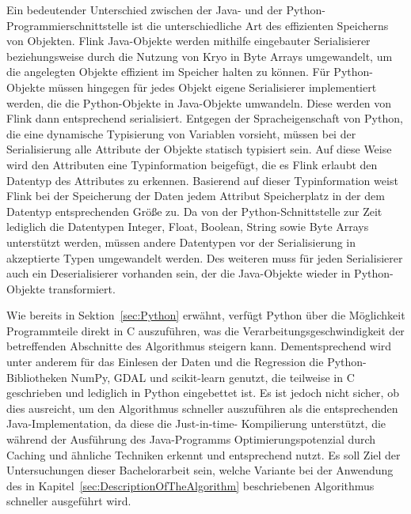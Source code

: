 Ein bedeutender Unterschied zwischen der Java- und der Python-Programmierschnittstelle ist die unterschiedliche Art des effizienten Speicherns von Objekten. Flink Java-Objekte werden mithilfe eingebauter Serialisierer beziehungsweise durch die Nutzung von Kryo in Byte Arrays umgewandelt, um die angelegten Objekte effizient im Speicher halten zu können. Für Python-Objekte müssen hingegen für jedes Objekt eigene Serialisierer implementiert werden, die die Python-Objekte in Java-Objekte umwandeln. Diese werden von Flink dann entsprechend serialisiert. Entgegen der Spracheigenschaft von Python, die eine dynamische Typisierung von Variablen vorsieht, müssen bei der Serialisierung alle Attribute der Objekte statisch typisiert sein. Auf diese Weise wird den Attributen eine Typinformation beigefügt, die es Flink erlaubt den Datentyp des Attributes zu erkennen. Basierend auf dieser Typinformation weist Flink bei der Speicherung der Daten jedem Attribut Speicherplatz in der dem Datentyp entsprechenden Größe zu. Da von der Python-Schnittstelle zur Zeit lediglich die Datentypen Integer, Float, Boolean, String sowie Byte Arrays unterstützt werden, müssen andere Datentypen vor der Serialisierung in akzeptierte Typen umgewandelt werden. Des weiteren muss für jeden Serialisierer auch ein Deserialisierer vorhanden sein, der die Java-Objekte wieder in Python-Objekte transformiert. 

Wie bereits in Sektion~\ref{sec:Python} erwähnt, verfügt Python über die Möglichkeit Programmteile direkt in C auszuführen, was die Verarbeitungsgeschwindigkeit der betreffenden Abschnitte des Algorithmus steigern kann. Dementsprechend wird unter anderem für das Einlesen der Daten und die Regression die Python-Bibliotheken NumPy, GDAL und scikit-learn genutzt, die teilweise in C geschrieben und lediglich in Python eingebettet ist. Es ist jedoch nicht sicher, ob dies ausreicht, um den Algorithmus schneller auszuführen als die entsprechenden Java-Implementation, da diese die Just-in-time- Kompilierung unterstützt, die während der Ausführung des Java-Programms Optimierungspotenzial durch Caching und ähnliche Techniken erkennt und entsprechend nutzt. Es soll Ziel der Untersuchungen dieser Bachelorarbeit sein, welche Variante bei der Anwendung des in Kapitel~\ref{sec:DescriptionOfTheAlgorithm} beschriebenen Algorithmus schneller ausgeführt wird.

